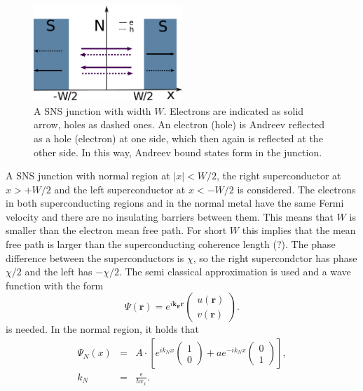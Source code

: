\begin{figure}
\centering
\includegraphics[width=0.5\textwidth]{figure/framework-analytical/sns}
\caption{A SNS junction with width $W$. Electrons are indicated as solid arrow, holes as dashed ones. An electron (hole) is Andreev reflected as a hole (electron) at one side, which then again is reflected at the other side. In this way, Andreev bound states form in the junction.}\label{fig:sns-junction}
\end{figure}
A SNS junction with normal region at $|x| < W/2$, the right superconductor at $x > + W/2$ and the left superconductor at $x < -W/2$ is considered. The electrons in both superconducting regions and in the normal metal have the same Fermi velocity and there are no insulating barriers between them. This means that $W$  is smaller than the electron mean free path. For short $W$ this implies that the mean free path is larger than the superconducting coherence length (?). The phase difference between the superconductors is $\chi$, so the right supercondctor has phase $\chi/2$ and the left has $-\chi/2$. 
The semi classical approximation is used and a wave function with the form
\begin{equation}
\Psi \left( \mathbf{r} \right) = e^{i \mathbf{k_F} \mathbf{r} } \begin{pmatrix} u \left( \mathbf{r} \right) \\ v \left( \mathbf{r} \right)\end{pmatrix}.
\end{equation}
is needed. 
In the normal region, it holds that 
\begin{eqnarray}
\Psi_N \left( x \right) &=& A\cdot \left[ e^{i k_N x } \begin{pmatrix} 1 \\ 0 \end{pmatrix} + a e^{-i k_N x } \begin{pmatrix} 0 \\ 1 \end{pmatrix} \right], \label{eq:sns-psi-normal}\\
k_N &=& \frac{\epsilon}{\hbar v_x}.
\end{eqnarray}
